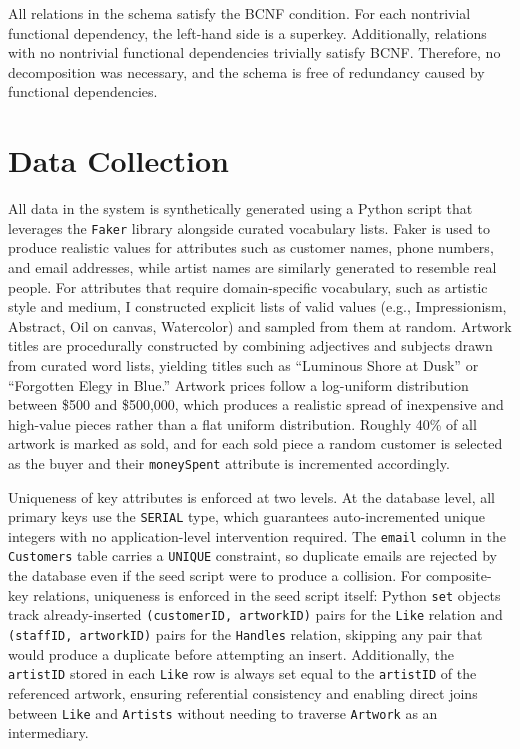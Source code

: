 \documentclass[12pt]{article}
\begin{document}
All relations in the schema satisfy the BCNF condition. For each nontrivial functional dependency, the left-hand side is a superkey. Additionally, relations with no nontrivial functional dependencies trivially satisfy BCNF. Therefore, no decomposition was necessary, and the schema is free of redundancy caused by functional dependencies.

\newpage

\section*{Data Collection}

All data in the system is synthetically generated using a Python script that leverages the \texttt{Faker} library alongside curated vocabulary lists. Faker is used to produce realistic values for attributes such as customer names, phone numbers, and email addresses, while artist names are similarly generated to resemble real people. For attributes that require domain-specific vocabulary, such as artistic style and medium, I constructed explicit lists of valid values (e.g., Impressionism, Abstract, Oil on canvas, Watercolor) and sampled from them at random. Artwork titles are procedurally constructed by combining adjectives and subjects drawn from curated word lists, yielding titles such as ``Luminous Shore at Dusk'' or ``Forgotten Elegy in Blue.'' Artwork prices follow a log-uniform distribution between \$500 and \$500{,}000, which produces a realistic spread of inexpensive and high-value pieces rather than a flat uniform distribution. Roughly 40\% of all artwork is marked as sold, and for each sold piece a random customer is selected as the buyer and their \texttt{moneySpent} attribute is incremented accordingly.

Uniqueness of key attributes is enforced at two levels. At the database level, all primary keys use the \texttt{SERIAL} type, which guarantees auto-incremented unique integers with no application-level intervention required. The \texttt{email} column in the \texttt{Customers} table carries a \texttt{UNIQUE} constraint, so duplicate emails are rejected by the database even if the seed script were to produce a collision. For composite-key relations, uniqueness is enforced in the seed script itself: Python \texttt{set} objects track already-inserted \texttt{(customerID, artworkID)} pairs for the \texttt{Like} relation and \texttt{(staffID, artworkID)} pairs for the \texttt{Handles} relation, skipping any pair that would produce a duplicate before attempting an insert. Additionally, the \texttt{artistID} stored in each \texttt{Like} row is always set equal to the \texttt{artistID} of the referenced artwork, ensuring referential consistency and enabling direct joins between \texttt{Like} and \texttt{Artists} without needing to traverse \texttt{Artwork} as an intermediary.
\end{document}
